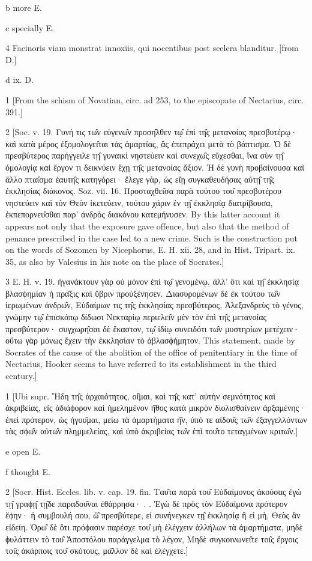 b
more E.

c
specially E.

4
Facinoris viam monstrat innoxiis, qui nocentibus post scelera blanditur. [from D.]

d
ix. D.

1
[From the schism of Novatian, circ. ad 253, to the episcopate of Nectarius, circ. 391.]

2
[Soc. v. 19. Γυνή τις τω̑ν εὐγενω̑ν προση̑λθεν τῳ̑ ἐπὶ τη̑ς μετανοίας πρεσβυτέρῳ· καὶ κατὰ μέρος ἐξομολογει̑ται τὰς ἁμαρτίας, ἃς ἐπεπράχει μετὰ τὸ βάπτισμα. Ὁ δὲ πρεσβύτερος παρήγγειλε τῃ̑ γυναικὶ νηστεύειν καὶ συνεχω̑ς εὔχεσθαι, ἵνα σὺν τῃ̑ όμολογίᾳ καὶ ἔργον τι δεικνύειν ἔχῃ τη̑ς μετανοίας ἄξιον. Ἡ δὲ γυνὴ προβαίνουσα καὶ ἄλλο πται̑σμα έαυτη̑ς κατηγόρει· ἔλεγε γὰρ, ὡς εἴῃ συγκαθευδήσας αὐτῃ̑ τη̑ς ἐκκλησίας διάκονος. Soz. vii. 16. Προσταχθει̑σα παρὰ τούτου του̑ πρεσβυτέρου νηστεύειν καὶ τὸν Θεὸν ἱκετεύειν, τούτου χάριν ἐν τῃ̑ ἐκκλησίᾳ διατρίβουσα, ἐκπεπορνευ̑σθαι παρ’ ἀνδρὸς διακόνου κατεμήνυσεν. By this latter account it appears not only that the exposure gave offence, but also that the method of penance prescribed in the case led to a new crime. Such is the construction put on the words of Sozomen by Nicephorus, E. H. xii. 28, and in Hist. Tripart. ix. 35, as also by Valesius in his note on the place of Socrates.]

3
E. H. v. 19. ἠγανάκτουν γὰρ οὐ μόνον ἐπὶ τῳ̑ γενομένῳ, ἀλλ’ ὅτι καὶ τῃ̑ ἐκκλησίᾳ βλασϕημίαν ἡ πρα̑ξις καὶ ὕβριν προὐξένησεν. Διασυρομένων δὲ ἐκ τούτου τω̑ν ἱερωμένων ἀνδρω̑ν, Εὐδαίμων τις τη̑ς ἐκκλησίας πρεσβύτερος, Ἀλεξανδρεὺς τὸ γένος, γνώμην τῳ̑ ἐπισκόπῳ δίδωσι Νεκταρίῳ περιελει̑ν μὲν τὸν ἐπὶ τη̑ς μετανοίας πρεσβύτερον· συγχωρη̑σαι δὲ ἕκαστον, τῳ̑ ἰδίῳ συνειδότι τω̑ν μυστηρίων μετέχειν· οὕτω γὰρ μόνως ἔχειν τὴν ἐκκλησίαν τὸ ἀβλασϕήμητον. This statement, made by Socrates of the cause of the abolition of the office of penitentiary in the time of Nectarius, Hooker seems to have referred to its establishment in the third century.]

1
[Ubi supr. Ἤδη τη̑ς ἀρχαιότητος, οἰ̑μαι, καὶ τη̑ς κατ’ αὐτὴν σεμνότητος καὶ ἀκριβείας, εἰς ἀδιάϕορον καὶ ἡμελημένον ἠ̑θος κατὰ μικρὸν διολισθαίνειν ἀρξαμένης· ἐπεὶ πρότερον, ὡς ἡγου̑μαι, μείω τὰ ἁμαρτήματα ἠ̑ν, ὑπό τε αἰδου̑ς τω̑ν ἐξαγγελλόντων τὰς σϕω̑ν αὐτω̑ν πλημμελείας, καὶ ὑπὸ ἀκριβείας τω̑ν ἐπὶ του̑το τεταγμένων κριτω̑ν.]

e
open E.

f
thought E.

2
[Socr. Hist. Eccles. lib. v. cap. 19. fin. Ταυ̑τα παρὰ του̑ Εὐδαίμονος ἀκούσας ἐγὼ τῃ̑ γραϕῃ̑ τῃ̑δε παραδου̑ναι ἐθάρρησα· . . Ἐγὼ δὲ πρὸς τὸν Εὐδαίμονα πρότερον ἔϕην· ἡ συμβουλή σου, ὡ̑ πρεσβύτερε, εἰ συνήνεγκεν τῃ̑ ἐκκλησίᾳ ἢ εἰ μὴ, Θεὸς ἂν εἰδείη. Ὁρω̑ δὲ ὅτι πρόϕασιν παρέσχε του̑ μὴ ἐλέγχειν ἀλλήλων τὰ ἁμαρτήματα, μηδὲ ϕυλάττειν τὸ του̑ Ἀποστόλου παράγγελμα τὸ λέγον, Μηδὲ συγκοινωνει̑τε τοι̑ς ἔργοις τοι̑ς ἀκάρποις του̑ σκότους, μα̑λλον δὲ καὶ ἐλέγχετε.]

